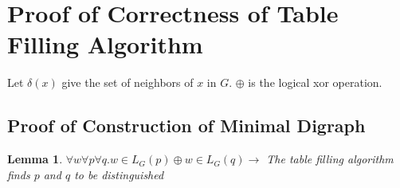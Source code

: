 \documentclass[12pt]{article}
\newtheorem{lemma}{Lemma}
\begin{document}
\section{Proof of Correctness of Table Filling Algorithm}

Let $\delta(x)$ give the set of neighbors of $x$ in $G$. $\oplus$ is the logical xor operation.

\subsection{Proof of Construction of Minimal Digraph}

\begin{lemma}
\label{thm:tbl_correctness1}
$\forall w \forall p \forall q . w \in L_G(p) \oplus w \in L_G(q) \rightarrow$ The table filling algorithm finds $p$ and $q$
to be distinguished
\end{lemma}
\end{document}
